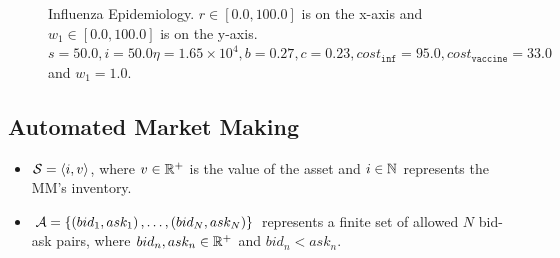 \begin{figure}[h!]
    \centering
    \caption{Influenza Epidemiology. $ r \in \left[ 0.0, 100.0 \right]$ is on the x-axis and $ w_1 \in \left[ 0.0, 100.0 \right]$ is on the y-axis. $ s = 50.0, i = 50.0 \eta = 1.65 \times 10^4, b = 0.27, c = 0.23, cost_{\mathtt{inf}} = 95.0, cost_{\mathtt{vaccine}} = 33.0$ and $w_1 = 1.0 $.}
    \label{fig:robot1d}
\end{figure}


\subsection{Automated Market Making}
\label{sec:results_mm}

\begin{itemize}
    \item {\footnotesize $\mathcal{S} = \left\langle i, v\right\rangle$}, where {\footnotesize $v \in \mathbb{R}^{+}$} is the value of the asset and {\footnotesize $i \in \mathbb{N}$} represents the MM's inventory.
    \item {\footnotesize $\mathcal{A} = \left\lbrace \left(bid_1, ask_1\right), \ldots,
        \left(bid_N, ask_N\right) \right\rbrace$} represents a finite set of allowed $N$ bid-ask pairs, where {\footnotesize $bid_n, ask_n \in \mathbb{R}^{+}$} and {\footnotesize $bid_n < ask_n$}. 
\end{itemize}      

